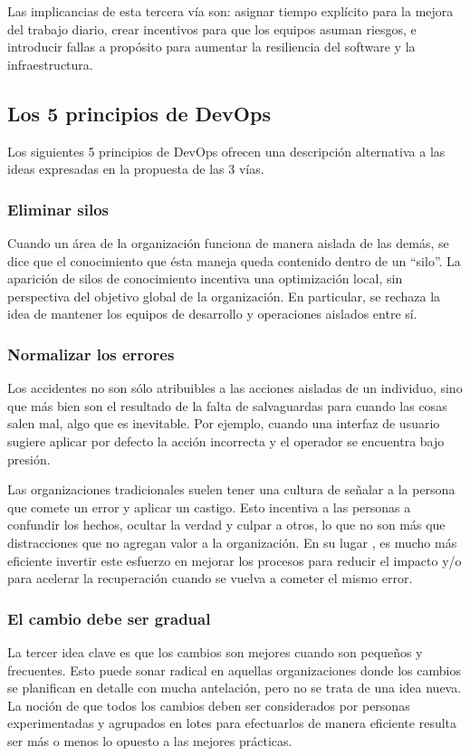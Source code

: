 Las implicancias de esta tercera vía son: asignar tiempo explícito
para la mejora del trabajo diario, crear incentivos para que los
equipos asuman riesgos, e introducir fallas a propósito para aumentar
la resiliencia del software y la infraestructura.
%
\subsection{Los 5 principios de DevOps}
%
Los siguientes 5 principios de DevOps \cite{workbook} ofrecen una
descripción alternativa a las ideas expresadas en la propuesta de las
3 vías.
%
\subsubsection{Eliminar silos}
%
Cuando un área de la organización funciona de manera aislada de las
demás, se dice que el conocimiento que ésta maneja queda contenido
dentro de un ``silo''. La aparición de silos de conocimiento incentiva
una optimización local, sin perspectiva del objetivo global de la
organización. En particular, se rechaza la idea de mantener los
equipos de desarrollo y operaciones aislados entre sí.
%
\subsubsection{Normalizar los errores}
%
Los accidentes no son sólo atribuibles a las acciones aisladas de un
individuo, sino que más bien son el resultado de la falta de
salvaguardas para cuando las cosas salen mal, algo que es
inevitable. Por ejemplo, cuando una interfaz de usuario sugiere
aplicar por defecto la acción incorrecta y el operador se encuentra
bajo presión.

Las organizaciones tradicionales suelen tener una cultura de señalar a
la persona que comete un error y aplicar un castigo. Esto incentiva a
las personas a confundir los hechos, ocultar la verdad y culpar a
otros, lo que no son más que distracciones que no agregan valor a la
organización. En su lugar , es mucho más eficiente invertir este
esfuerzo en mejorar los procesos para reducir el impacto y/o para
acelerar la recuperación cuando se vuelva a cometer el mismo error.
%
\subsubsection{El cambio debe ser gradual}
%
La tercer idea clave es que los cambios son mejores cuando son
pequeños y frecuentes. Esto puede sonar radical en aquellas
organizaciones donde los cambios se planifican en detalle con mucha
antelación, pero no se trata de una idea nueva. La noción de que todos
los cambios deben ser considerados por personas experimentadas y
agrupados en lotes para efectuarlos de manera eficiente resulta ser
más o menos lo opuesto a las mejores prácticas.

